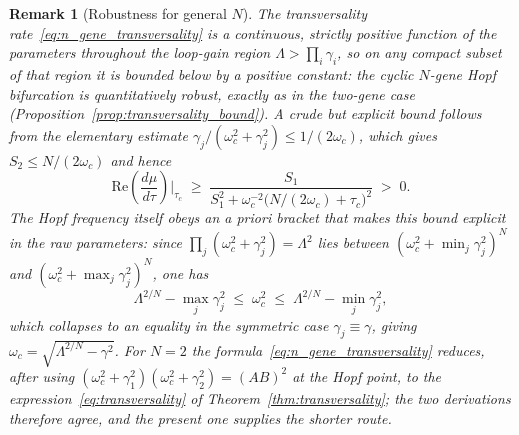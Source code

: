 \documentclass[sn-mathphys,Numbered]{sn-jnl}
\theoremstyle{thmstyleone}
\theoremstyle{thmstyletwo}
\theoremstyle{thmstylethree}
\newtheorem{remark}{Remark}
\begin{document}
\begin{remark}[Robustness for general $N$]
\label{rem:n_gene_robustness}
The transversality rate~\eqref{eq:n_gene_transversality} is a
continuous, strictly positive function of the parameters throughout the
loop-gain region $\Lambda>\prod_i\gamma_i$, so on any compact subset of
that region it is bounded below by a positive constant: the cyclic
$N$-gene Hopf bifurcation is quantitatively robust, exactly as in the
two-gene case (Proposition~\ref{prop:transversality_bound}). A crude
but explicit bound follows from the elementary estimate
$\gamma_j/(\omega_c^{2}+\gamma_j^{2})\leq 1/(2\omega_c)$, which gives
$S_2\leq N/(2\omega_c)$ and hence
\[
\mathrm{Re}\!\left(\frac{d\mu}{d\tau}\right)\!\bigg|_{\tau_c}
\;\geq\;
\frac{S_1}{S_1^{2}+\omega_c^{-2}\bigl(N/(2\omega_c)+\tau_c\bigr)^{2}}
\;>\;0.
\]
The Hopf frequency itself obeys an \emph{a priori} bracket that makes
this bound explicit in the raw parameters: since
$\prod_j(\omega_c^{2}+\gamma_j^{2})=\Lambda^{2}$ lies between
$(\omega_c^{2}+\min_j\gamma_j^{2})^{N}$ and
$(\omega_c^{2}+\max_j\gamma_j^{2})^{N}$, one has
\begin{equation}
\Lambda^{2/N}-\max_j\gamma_j^{2}
\;\leq\;\omega_c^{2}\;\leq\;
\Lambda^{2/N}-\min_j\gamma_j^{2},
\label{eq:omega_bracket}
\end{equation}
which collapses to an equality in the symmetric case
$\gamma_j\equiv\gamma$, giving $\omega_c=\sqrt{\Lambda^{2/N}-\gamma^{2}}$.
For $N=2$ the formula~\eqref{eq:n_gene_transversality} reduces, after
using $(\omega_c^{2}+\gamma_1^{2})(\omega_c^{2}+\gamma_2^{2})=(AB)^{2}$
at the Hopf point, to the expression~\eqref{eq:transversality} of
Theorem~\ref{thm:transversality}; the two derivations therefore agree,
and the present one supplies the shorter route.
\end{remark}
\end{document}
